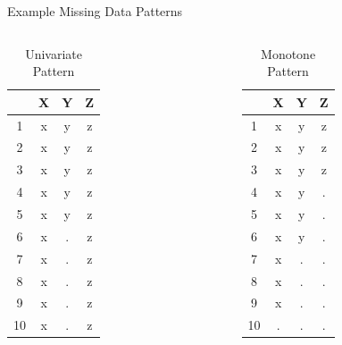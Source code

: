 \documentclass{beamer}\usepackage[]{graphicx}\usepackage[]{color}
\begin{document}
\begin{frame}{Example Missing Data Patterns}
  


\begin{columns}[T]
  \begin{column}{0.33\textwidth}
    
\begin{table}[ht]
\centering
\begin{tabular}{cccc}
  \toprule
 & X & Y & Z \\ 
  \midrule
1 & x & y & z \\ 
  2 & x & y & z \\ 
  3 & x & y & z \\ 
  4 & x & y & z \\ 
  5 & x & y & z \\ 
  6 & x & . & z \\ 
  7 & x & . & z \\ 
  8 & x & . & z \\ 
  9 & x & . & z \\ 
  10 & x & . & z \\ 
   \bottomrule
\end{tabular}
\caption{Univariate Pattern} 
\end{table}


\end{column}
\begin{column}{0.33\textwidth}
  
\begin{table}[ht]
\centering
\begin{tabular}{cccc}
  \toprule
 & X & Y & Z \\ 
  \midrule
1 & x & y & z \\ 
  2 & x & y & z \\ 
  3 & x & y & z \\ 
  4 & x & y & . \\ 
  5 & x & y & . \\ 
  6 & x & y & . \\ 
  7 & x & . & . \\ 
  8 & x & . & . \\ 
  9 & x & . & . \\ 
  10 & . & . & . \\ 
   \bottomrule
\end{tabular}
\caption{Monotone Pattern} 
\end{table}


\end{column}
\end{columns}
\end{frame}
\end{document}
